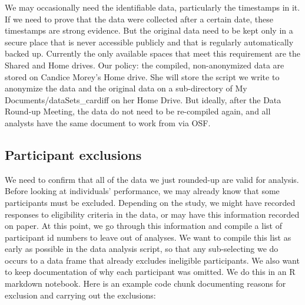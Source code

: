 \documentclass[
  12pt,
]{book}
\begin{document}
We may occasionally need the identifiable data, particularly the timestamps in it. If we need to prove that the data were collected after a certain date, these timestamps are strong evidence. But the original data need to be kept only in a secure place that is never accessible publicly and that is regularly automatically backed up. Currently the only available spaces that meet this requirement are the Shared and Home drives. Our policy: the compiled, non-anonymized data are stored on Candice Morey's Home drive. She will store the script we write to anonymize the data and the original data on a sub-directory of My Documents/dataSets\_cardiff on her Home Drive. But ideally, after the Data Round-up Meeting, the data do not need to be re-compiled again, and all analysts have the same document to work from via OSF.

\subsection{Participant exclusions}\label{participant-exclusions}

We need to confirm that all of the data we just rounded-up are valid for analysis. Before looking at individuals' performance, we may already know that some participants must be excluded. Depending on the study, we might have recorded responses to eligibility criteria in the data, or may have this information recorded on paper. At this point, we go through this information and compile a list of participant id numbers to leave out of analyses. We want to compile this list as early as possible in the data analysis script, so that any sub-selecting we do occurs to a data frame that already excludes ineligible participants. We also want to keep documentation of why each participant was omitted. We do this in an R markdown notebook. Here is an example code chunk documenting reasons for exclusion and carrying out the exclusions:
\end{document}
